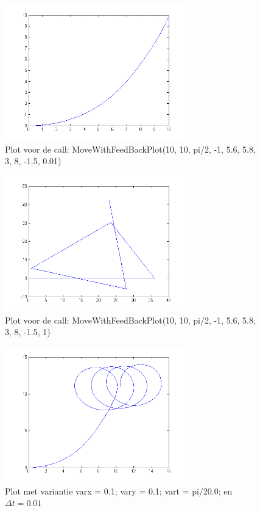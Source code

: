 \documentclass[a4paper]{article}
\begin{document}
\begin{figure}[h]
	\centering
	\includegraphics[width=0.7\textwidth]{imgs/example_plot.png}
	\caption{Plot voor de call: MoveWithFeedBackPlot(10, 10, pi/2, -1, 5.6, 5.8, 3, 8, -1.5, 0.01)}
	\label{fig:goed}
\end{figure}
\begin{figure}[h]
	\centering
	\includegraphics[width=0.7\textwidth]{imgs/fail_dt.png}
	\caption{Plot voor de call: MoveWithFeedBackPlot(10, 10, pi/2, -1, 5.6, 5.8, 3, 8, -1.5, 1)}
	\label{fig:slecht}
\end{figure}
\begin{figure}[h]
	\centering
	\includegraphics[width=0.7\textwidth]{imgs/small_variance.png}
	\caption{Plot met variantie varx = 0.1; vary = 0.1; vart = pi/20.0; en $\Delta t = 0.01$}
	\label{fig:lowvar}
\end{figure}
\end{document}
